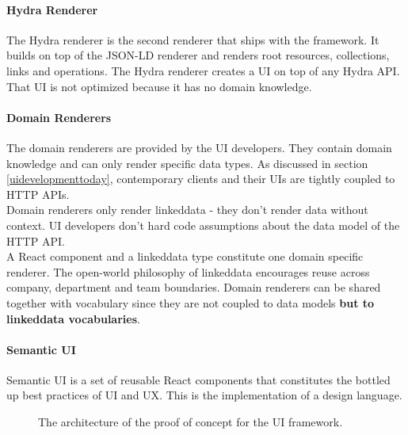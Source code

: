 \paragraph{Hydra Renderer}
The Hydra renderer is the second renderer that ships with the framework. It builds on top of the JSON-LD renderer and renders root resources, collections, links and operations. The Hydra renderer creates a UI on top of any Hydra API. That UI is not optimized because it has no domain knowledge.

\paragraph{Domain Renderers}
The domain renderers are provided by the UI developers. They contain domain knowledge and can only render specific data types. As discussed in section \ref{uidevelopmenttoday}, contemporary clients and their UIs are tightly coupled to HTTP APIs. \\
Domain renderers only render \gls{linkeddata} - they don't render data without context. UI developers don't hard code assumptions about the data model of the HTTP API. \\
A React component and a \gls{linkeddata} type constitute one domain specific renderer. The open-world philosophy of \gls{linkeddata} encourages reuse across company, department and team boundaries. Domain renderers can be shared together with vocabulary since they are not coupled to data models \textbf{but to \gls{linkeddata} vocabularies}.

\paragraph{Semantic UI}
Semantic UI is a set of reusable React components that constitutes the bottled up best practices of UI and UX. This is the implementation of a design language.

\begin{figure}[!htb]
  \caption{The architecture of the proof of concept for the UI framework.}
\end{figure}

